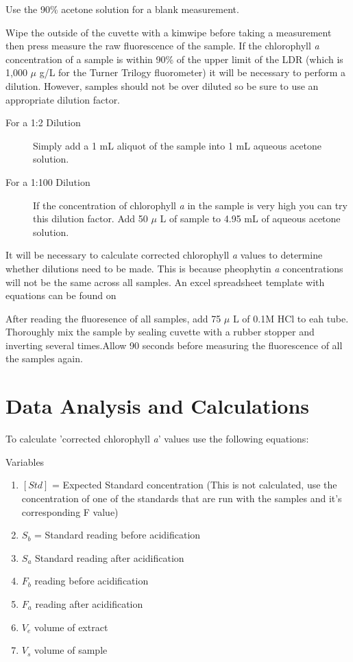 \documentclass[12pt]{../SOP3}\usepackage[]{graphicx}\usepackage[]{color}
\begin{document}
\NP Use the 90\% acetone solution for a blank measurement.


\NP Wipe the outside of the cuvette with a kimwipe before taking a measurement then press measure the raw fluorescence of the sample. If the chlorophyll \textit{a} concentration of a sample is within 90\% of the upper limit of the LDR (which is 1,000 $\mu$ g/L for the Turner Trilogy fluorometer) it will be necessary to perform a dilution. However, samples should not be over diluted so be sure to use an appropriate dilution factor. 

\begin{description} 
\item[For a 1:2 Dilution] Simply add a 1 mL aliquot of the sample into 1 mL aqueous acetone solution.
\item[For a 1:100 Dilution] If the concentration of chlorophyll \textit{a} in the sample is very high you can try this dilution factor. Add 50 $\mu$ L of sample to 4.95 mL of aqueous acetone solution. 
\end{description}

\NP It will be necessary to calculate corrected chlorophyll \textit{a} values to determine whether dilutions need to be made. This is because pheophytin \textit{a} concentrations will not be the same across all samples. An excel spreadsheet template with equations can be found on %

\NP After reading the fluoresence of all samples, add 75 $\mu$ L of  0.1M HCl to eah tube. Thoroughly mix the sample by sealing cuvette with a rubber stopper and inverting several times.Allow 90 seconds before measuring the fluorescence of all the samples again. 

\section{Data Analysis and Calculations}
To calculate 'corrected chlorophyll \textit{a}' values use the following equations: %

\NP Variables
\begin{enumerate}
\item $[Std]$ = Expected Standard concentration (This is not calculated, use the concentration of one of the standards that are run with the samples and it's corresponding F value)
\item $S_b$ = Standard reading before acidification
\item $S_a$ Standard reading after acidification
\item $F_b$ reading before acidification
\item $F_a$ reading after acidification
\item $V_e$ volume of extract
\item $V_s$ volume of sample 
\end{enumerate}
\end{document}
